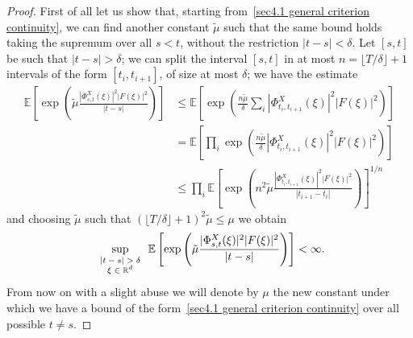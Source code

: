 \documentclass[10pt]{article}
\newcommand{\tmscript}[1]{\text{\scriptsize{$#1$}}}
\begin{document}
\begin{proof}
  First of all let us show that, starting from~\eqref{sec4.1 general criterion
  continuity}, we can find another constant $\tilde{\mu}$ such that the same
  bound holds taking the supremum over all $s < t$, without the restriction $|
  t - s | < \delta$. Let $[s, t]$ be such that $| t - s | > \delta$; we can
  split the interval $[s, t]$ in at most $n = \lfloor T / \delta \rfloor + 1$
  intervals of the form $[t_i, t_{i + 1}]$, of size at most $\delta$; we have
  the estimate
%  
  \begin{align*}
    \mathbb{E} \left[ \exp \left( \tilde{\mu}  \frac{| \Phi^X_{s, t} (\xi) |^2
    | F (\xi) |^2}{| t - s |} \right) \right] & \leqslant \mathbb{E} \left[
    \exp \left( \frac{n \tilde{\mu}}{\delta}  \sum_i | \Phi^X_{t_i, t_{i + 1}}
    (\xi) |^2 | F (\xi) |^2 \right) \right]\\
    & =\mathbb{E} \left[ \prod_i \exp \left( \frac{n \tilde{\mu}}{\delta} |
    \Phi^X_{t_i, t_{i + 1}} (\xi) |^2 | F (\xi) |^2 \right) \right]\\
    & \leqslant \prod_i \mathbb{E} \left[ \exp \left( n^2 \tilde{\mu} 
    \frac{| \Phi^X_{t_i, t_{i + 1}} (\xi) |^2 | F (\xi) |^2}{| t_{i + 1} - t_i
    |} \right) \right]^{1 / n}
  \end{align*}
%  
  and choosing $\tilde{\mu}$ such that $ (\lfloor T / \delta \rfloor + 1)^2
  \tilde{\mu} \leqslant \mu$ we obtain
  \[ \sup_{\tmscript{\begin{array}{c}
       | t - s | > \delta\\
       \xi \in \mathbb{R}^d
     \end{array}}} \mathbb{E} \left[ \exp \left( \tilde{\mu}  \frac{|
     \Phi^X_{s, t} (\xi) |^2  | F (\xi) |^2}{| t - s |} \right) \right] <
     \infty . \]
  From now on with a slight abuse we will denote by $\mu$ the new constant
  under which we have a bound of the form~\eqref{sec4.1 general criterion
  continuity} over all possible $t \neq s$.
  

\end{proof}
\end{document}
